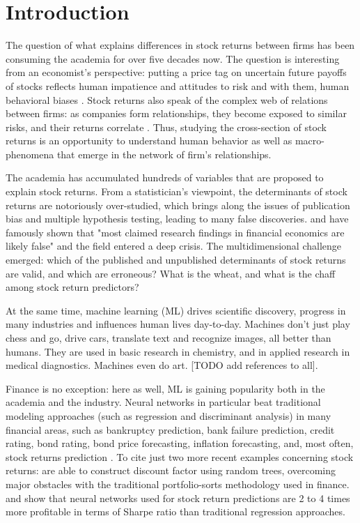 \chapter{Introduction}
\label{chap:int}

The question of what explains differences in stock returns between firms has been consuming the academia for over five decades now. The question is interesting from an economist's perspective: putting a price tag on uncertain future payoffs of stocks reflects human impatience and attitudes to risk \citep{cochrane2009asset} and with them, human behavioral biases \citep{kahneman2013prospect}. Stock returns also speak of the complex web of relations between firms: as companies form relationships, they become exposed to similar risks, and their returns correlate \citep{chi2010network}. Thus, studying the cross-section of stock returns is an opportunity to understand human behavior as well as macro-phenomena that emerge in the network of firm's relationships.

The academia has accumulated hundreds of variables that are proposed to explain stock returns. From a statistician's viewpoint, the determinants of stock returns are notoriously over-studied, which brings along the issues of publication bias and multiple hypothesis testing, leading to many false discoveries. \cite{harvey2016and} and \cite{mclean2016does} have famously shown that "most claimed research findings in financial economics are likely false" \cite[p.~5]{harvey2016and} and the field entered a deep crisis. The multidimensional challenge \citep{cochrane2011presidential} emerged: which of the published and unpublished determinants of stock returns are valid, and which are erroneous? What is the wheat, and what is the chaff among stock return predictors?

At the same time, machine learning (ML) drives scientific discovery, progress in many industries and influences human lives day-to-day. Machines don't just play chess and go, drive cars, translate text and recognize images, all better than humans. They are used in basic research in chemistry, and in applied research in medical diagnostics. Machines even do art. [TODO add references to all]. 

Finance is no exception: here as well, ML is gaining popularity both in the academia and the industry. Neural networks in particular beat traditional modeling approaches (such as regression and discriminant analysis) in many financial areas, such as bankruptcy prediction, bank failure prediction, credit rating, bond rating, bond price forecasting, inflation forecasting, and, most often, stock returns prediction \citep{fadlalla2001analysis}. To cite just two more recent examples concerning stock returns: \cite{bryzgalova2019forest} are able to construct discount factor using random trees, overcoming major obstacles with the traditional portfolio-sorts methodology used in finance. \cite{gu2020empirical} and \cite{tobek2020does} show that neural networks used for stock return predictions are 2 to 4 times more profitable in terms of Sharpe ratio than traditional regression approaches.  

